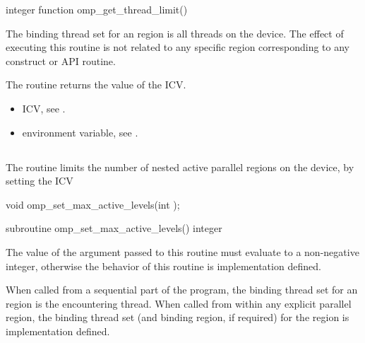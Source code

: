 \fortranspecificstart
\begin{boxedcode}
integer function omp\_get\_thread\_limit()
\end{boxedcode}
\fortranspecificend

\binding
The binding thread set for an  region is all threads on the 
device. The effect of executing this routine is not related to any specific region 
corresponding to any construct or API routine. 

\effect
The  routine returns the value of the  ICV.

\crossreferences
\begin{itemize}
\item {} ICV, see 
.

\item {} environment variable, see 
.
\end{itemize}









\subsection{}
\label{subsec:omp_set_max_active_levels}
\summary
The  routine limits the number of nested active 
parallel regions on the device, by setting the  ICV

\format
\ccppspecificstart
\begin{boxedcode}
void omp\_set\_max\_active\_levels(int );
\end{boxedcode}
\ccppspecificend

\fortranspecificstart
\begin{boxedcode}
subroutine omp\_set\_max\_active\_levels()
integer 
\end{boxedcode}
\fortranspecificend

\constraints
The value of the argument passed to this routine must evaluate to a non-negative integer, 
otherwise the behavior of this routine is implementation defined.

\binding
When called from a sequential part of the program, the binding thread set for an 
 region is the encountering thread. When called 
from within any explicit parallel region, the binding thread set (and binding region, if 
required) for the  region is implementation defined. 

